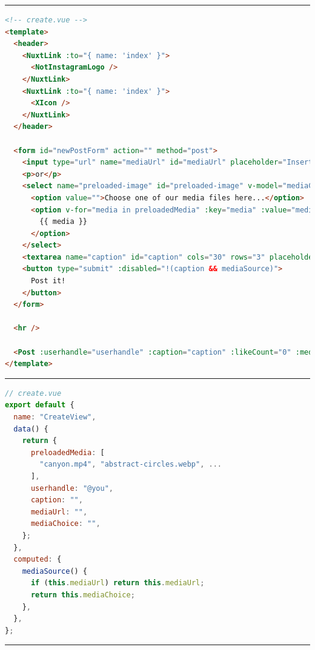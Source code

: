 \documentclass[a4paper, 12pt]{article}
\begin{document}
\vspace{0.5cm} \hrule \vspace{0.5cm}

\begin{lstlisting}[caption=Create page in Nuxt (Template), label={lst:Nuxt:Create:Template}, language=HTML]
<!-- create.vue -->
<template>
  <header>
    <NuxtLink :to="{ name: 'index' }">
      <NotInstagramLogo />
    </NuxtLink>
    <NuxtLink :to="{ name: 'index' }">
      <XIcon />
    </NuxtLink>
  </header>
  
  <form id="newPostForm" action="" method="post">
    <input type="url" name="mediaUrl" id="mediaUrl" placeholder="Insert your media URL here..." v-model="mediaUrl" />
    <p>or</p>
    <select name="preloaded-image" id="preloaded-image" v-model="mediaChoice">
      <option value="">Choose one of our media files here...</option>
      <option v-for="media in preloadedMedia" :key="media" :value="media">
        {{ media }}
      </option>
    </select>
    <textarea name="caption" id="caption" cols="30" rows="3" placeholder="Type your caption here" v-model="caption" />
    <button type="submit" :disabled="!(caption && mediaSource)">
      Post it!
    </button>
  </form>
  
  <hr />
  
  <Post :userhandle="userhandle" :caption="caption" :likeCount="0" :mediaSource="mediaSource" :hideActionIcons="true" />
</template>
\end{lstlisting}

\vspace{0.5cm} \hrule \vspace{0.5cm}

\begin{lstlisting}[caption=Create page in Nuxt (Script), label={lst:Nuxt:Create:Script}, language=JavaScript, firstnumber=31]
// create.vue
export default {
  name: "CreateView",
  data() {
    return {
      preloadedMedia: [
        "canyon.mp4", "abstract-circles.webp", ...
      ],
      userhandle: "@you",
      caption: "",
      mediaUrl: "",
      mediaChoice: "",
    };
  },
  computed: {
    mediaSource() {
      if (this.mediaUrl) return this.mediaUrl;
      return this.mediaChoice;
    },
  },
};
\end{lstlisting}

\vspace{0.5cm} \hrule \vspace{0.5cm}
\end{document}
